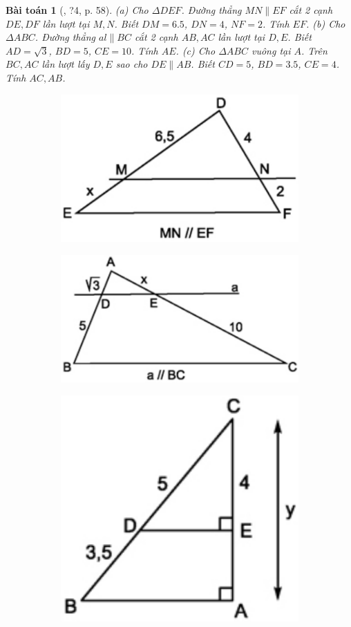 \documentclass{article}
\newtheorem{baitoan}{Bài toán}
\begin{document}
\begin{baitoan}[\cite{SGK_Toan_8_tap_2}, ?4, p. 58]
	(a) Cho $\Delta DEF$. Đường thẳng $MN\parallel EF$ cắt 2 cạnh $DE,DF$ lần lượt tại $M,N$. Biết $DM = 6.5$, $DN = 4$, $NF = 2$. Tính $EF$. (b) Cho $\Delta ABC$. Đường thẳng $al\parallel BC$ cắt 2 cạnh $AB,AC$ lần lượt tại $D,E$. Biết $AD = \sqrt{3}$, $BD = 5$, $CE = 10$. Tính $AE$. (c) Cho $\Delta ABC$ vuông tại $A$. Trên $BC,AC$ lần lượt lấy $D,E$ sao cho $DE\parallel AB$. Biết $CD = 5$, $BD = 3.5$, $CE = 4$. Tính $AC,AB$.
	\begin{figure}[H]
		\centering
		\begin{subfigure}{.3\textwidth}
			\centering
			\includegraphics[width=.6\linewidth]{SGK_Toan_8_4}
		\end{subfigure}%
		\begin{subfigure}{.3\textwidth}
			\centering
			\includegraphics[width=.7\linewidth]{SGK_Toan_8_5a}
		\end{subfigure}%
		\begin{subfigure}{.3\textwidth}
			\centering
			\includegraphics[width=.4\linewidth]{SGK_Toan_8_5b}
		\end{subfigure}
	\end{figure}
\end{baitoan}
\end{document}
